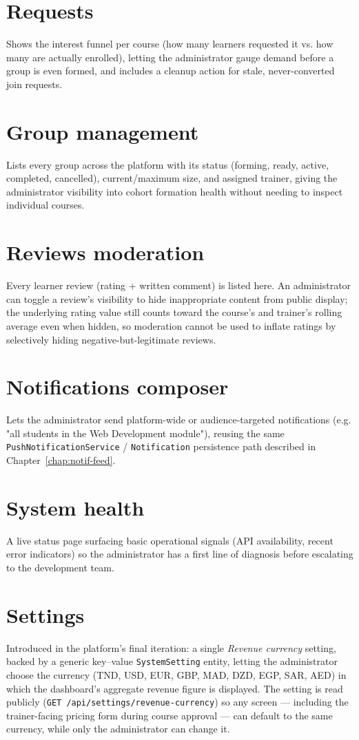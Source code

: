 \documentclass[a4paper,12pt]{report}
\begin{document}
\section{Requests}
Shows the interest funnel per course (how many learners requested it vs.
how many are actually enrolled), letting the administrator gauge demand
before a group is even formed, and includes a cleanup action for stale,
never-converted join requests.

\section{Group management}
Lists every group across the platform with its status (forming, ready,
active, completed, cancelled), current/maximum size, and assigned
trainer, giving the administrator visibility into cohort formation
health without needing to inspect individual courses.

\section{Reviews moderation}
Every learner review (rating + written comment) is listed here. An
administrator can toggle a review's visibility to hide inappropriate
content from public display; the underlying rating value still counts
toward the course's and trainer's rolling average even when hidden, so
moderation cannot be used to inflate ratings by selectively hiding
negative-but-legitimate reviews.

\section{Notifications composer}
Lets the administrator send platform-wide or audience-targeted
notifications (e.g. "all students in the Web Development module"),
reusing the same \texttt{PushNotificationService} / \texttt{Notification}
persistence path described in Chapter~\ref{chap:notif-feed}.

\section{System health}
A live status page surfacing basic operational signals (API availability,
recent error indicators) so the administrator has a first line of
diagnosis before escalating to the development team.

\section{Settings}
Introduced in the platform's final iteration: a single \emph{Revenue
currency} setting, backed by a generic key--value \texttt{SystemSetting}
entity, letting the administrator choose the currency (TND, USD, EUR,
GBP, MAD, DZD, EGP, SAR, AED) in which the dashboard's aggregate revenue
figure is displayed. The setting is read publicly
(\texttt{GET /api/settings/revenue-currency}) so any screen --- including
the trainer-facing pricing form during course approval --- can default to
the same currency, while only the administrator can change it.
\end{document}

